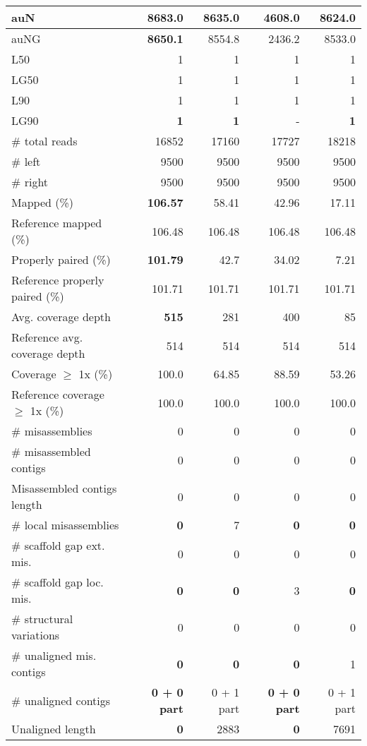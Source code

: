 \documentclass[12pt,a4paper]{article}
\begin{document}
\begin{table}[ht]
\begin{center}
\begin{tabular}{|l*{4}{|r}|}
auN & {\bf 8683.0} & 8635.0 & 4608.0 & 8624.0 \\ \hline
auNG & {\bf 8650.1} & 8554.8 & 2436.2 & 8533.0 \\ \hline
L50 & 1 & 1 & 1 & 1 \\ \hline
LG50 & 1 & 1 & 1 & 1 \\ \hline
L90 & 1 & 1 & 1 & 1 \\ \hline
LG90 & {\bf 1} & {\bf 1} & - & {\bf 1} \\ \hline
\# total reads & 16852 & 17160 & 17727 & 18218 \\ \hline
\# left & 9500 & 9500 & 9500 & 9500 \\ \hline
\# right & 9500 & 9500 & 9500 & 9500 \\ \hline
Mapped (\%) & {\bf 106.57} & 58.41 & 42.96 & 17.11 \\ \hline
Reference mapped (\%) & 106.48 & 106.48 & 106.48 & 106.48 \\ \hline
Properly paired (\%) & {\bf 101.79} & 42.7 & 34.02 & 7.21 \\ \hline
Reference properly paired (\%) & 101.71 & 101.71 & 101.71 & 101.71 \\ \hline
Avg. coverage depth & {\bf 515} & 281 & 400 & 85 \\ \hline
Reference avg. coverage depth & 514 & 514 & 514 & 514 \\ \hline
Coverage $\geq$ 1x (\%) & 100.0 & 64.85 & 88.59 & 53.26 \\ \hline
Reference coverage $\geq$ 1x (\%) & 100.0 & 100.0 & 100.0 & 100.0 \\ \hline
\# misassemblies & 0 & 0 & 0 & 0 \\ \hline
\# misassembled contigs & 0 & 0 & 0 & 0 \\ \hline
Misassembled contigs length & 0 & 0 & 0 & 0 \\ \hline
\# local misassemblies & {\bf 0} & 7 & {\bf 0} & {\bf 0} \\ \hline
\# scaffold gap ext. mis. & 0 & 0 & 0 & 0 \\ \hline
\# scaffold gap loc. mis. & {\bf 0} & {\bf 0} & 3 & {\bf 0} \\ \hline
\# structural variations & 0 & 0 & 0 & 0 \\ \hline
\# unaligned mis. contigs & {\bf 0} & {\bf 0} & {\bf 0} & 1 \\ \hline
\# unaligned contigs & {\bf 0 + 0 part} & 0 + 1 part & {\bf 0 + 0 part} & 0 + 1 part \\ \hline
Unaligned length & {\bf 0} & 2883 & {\bf 0} & 7691 \\ \hline

\end{tabular}
\end{center}
\end{table}
\end{document}
